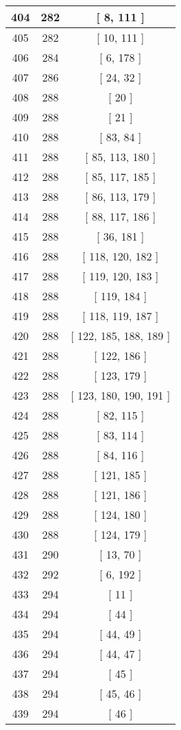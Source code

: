 \begin{center}
\begin{longtable}[H]{|| c c c ||}
404 & 282 & [ 8, 111 ]
\\\hline
405 & 282 & [ 10, 111 ]
\\\hline
406 & 284 & [ 6, 178 ]
\\\hline
407 & 286 & [ 24, 32 ]
\\\hline
408 & 288 & [ 20 ]
\\\hline
409 & 288 & [ 21 ]
\\\hline
410 & 288 & [ 83, 84 ]
\\\hline
411 & 288 & [ 85, 113, 180 ]
\\\hline
412 & 288 & [ 85, 117, 185 ]
\\\hline
413 & 288 & [ 86, 113, 179 ]
\\\hline
414 & 288 & [ 88, 117, 186 ]
\\\hline
415 & 288 & [ 36, 181 ]
\\\hline
416 & 288 & [ 118, 120, 182 ]
\\\hline
417 & 288 & [ 119, 120, 183 ]
\\\hline
418 & 288 & [ 119, 184 ]
\\\hline
419 & 288 & [ 118, 119, 187 ]
\\\hline
420 & 288 & [ 122, 185, 188, 189 ]
\\\hline
421 & 288 & [ 122, 186 ]
\\\hline
422 & 288 & [ 123, 179 ]
\\\hline
423 & 288 & [ 123, 180, 190, 191 ]
\\\hline
424 & 288 & [ 82, 115 ]
\\\hline
425 & 288 & [ 83, 114 ]
\\\hline
426 & 288 & [ 84, 116 ]
\\\hline
427 & 288 & [ 121, 185 ]
\\\hline
428 & 288 & [ 121, 186 ]
\\\hline
429 & 288 & [ 124, 180 ]
\\\hline
430 & 288 & [ 124, 179 ]
\\\hline
431 & 290 & [ 13, 70 ]
\\\hline
432 & 292 & [ 6, 192 ]
\\\hline
433 & 294 & [ 11 ]
\\\hline
434 & 294 & [ 44 ]
\\\hline
435 & 294 & [ 44, 49 ]
\\\hline
436 & 294 & [ 44, 47 ]
\\\hline
437 & 294 & [ 45 ]
\\\hline
438 & 294 & [ 45, 46 ]
\\\hline
439 & 294 & [ 46 ]

\end{longtable}
\end{center}
